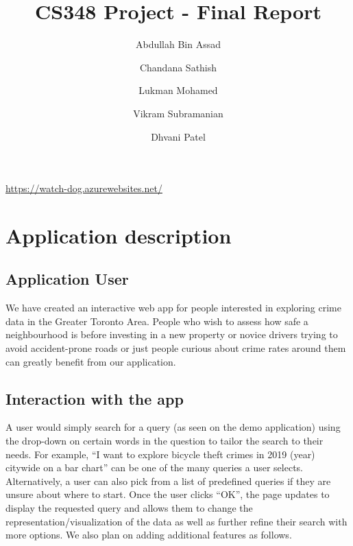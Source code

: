 \documentclass[12pt, a4paper]{article}
\title{CS348 Project - Final Report}
\author{Abdullah Bin Assad\and Chandana Sathish \and Lukman Mohamed \and Vikram Subramanian \and Dhvani Patel \\}
\begin{document}
\maketitle

\begin{center}

    \url{https://watch-dog.azurewebsites.net/}
\end{center}
\section*{Application description}
\subsection*{Application User}
We have created an interactive web app for people interested in exploring crime data in the Greater Toronto Area. People who wish to assess how safe a neighbourhood is before investing in a new property or novice drivers trying to avoid accident-prone roads or just people curious about crime rates around them can greatly benefit from our application.
\subsection*{Interaction with the app}
A user would simply search for a query (as seen on the demo application) using the drop-down on certain words in the question to tailor the search to their needs. For example, “I want to explore bicycle theft crimes in 2019 (year) citywide on a bar chart” can be one of the many queries a user selects. Alternatively, a user can also pick from a list of predefined queries if they are unsure about where to start. Once the user clicks “OK”, the page updates to display the requested query and allows them to change the representation/visualization of the data as well as further refine their search with more options. We also plan on adding additional features as follows.
\end{document}
